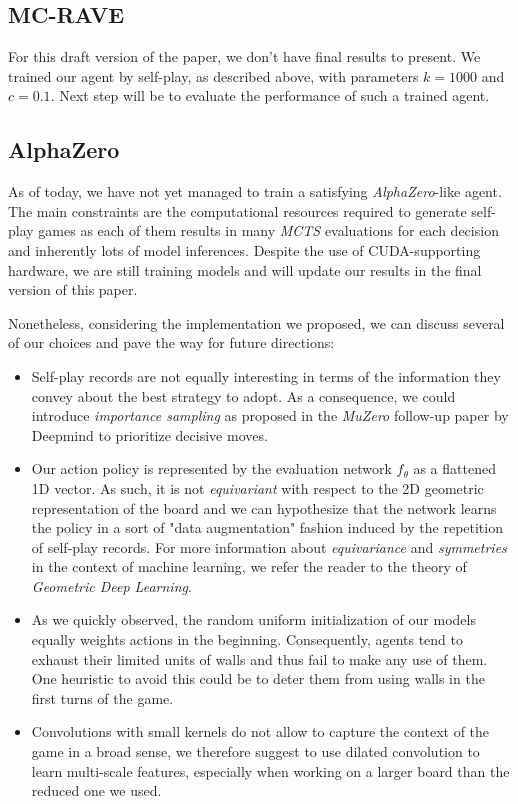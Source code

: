 \documentclass[journal, a4paper]{IEEEtran}
\begin{document}
\subsection{MC-RAVE}
For this draft version of the paper, we don't have final results to present. We trained our agent by self-play, as described above, with parameters $k=1000$ and $c=0.1$. Next step will be to evaluate the performance of such a trained agent.

\subsection{AlphaZero}
As of today, we have not yet managed to train a satisfying \textit{AlphaZero}-like agent. The main constraints are the computational resources required to generate self-play games as each of them results in many \textit{MCTS} evaluations for each decision and inherently lots of model inferences. Despite the use of CUDA-supporting hardware, we are still training models and will update our results in the final version of this paper.

Nonetheless, considering the implementation we proposed, we can discuss several of our choices and pave the way for future directions:
\begin{itemize}
    \item Self-play records are not equally interesting in terms of the information they convey about the best strategy to adopt. As a consequence, we could introduce \textit{importance sampling} as proposed in the \textit{MuZero}\cite{muzero} follow-up paper by Deepmind to prioritize decisive moves.
    \item Our action policy is represented by the evaluation network $f_\theta$ as a flattened 1D vector. As such, it is not \textit{equivariant} with respect to the 2D geometric representation of the board and we can hypothesize that the network learns the policy in a sort of "data augmentation" fashion induced by the repetition of self-play records. For more information about \textit{equivariance} and \textit{symmetries} in the context of machine learning, we refer the reader to the theory of \textit{Geometric Deep Learning}\cite{gdl}.
    \item As we quickly observed, the random uniform initialization of our models equally weights actions in the beginning. Consequently, agents tend to exhaust their limited units of walls and thus fail to make any use of them. One heuristic to avoid this could be to deter them from using walls in the first turns of the game.
    \item Convolutions with small kernels do not allow to capture the context of the game in a broad sense, we therefore suggest to use dilated convolution\cite{dilated-conv} to learn multi-scale features, especially when working on a larger board than the reduced one we used.
\end{itemize}
\end{document}
